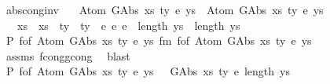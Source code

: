 \begin{isabellebody}
\isamarkupfalse%
%
\endisatagproof
{\isafoldproof}%
%
\isadelimproof
\isanewline
%
\endisadelimproof
\isanewline
\isanewline
{}\isamarkupfalse%
\ abs{\isacharunderscore}{\kern0pt}cong{\isacharunderscore}{\kern0pt}inv{\isacharcolon}{\kern0pt}\isanewline
\ \ \ {\isachardoublequoteopen}Atom\ {\isacharparenleft}{\kern0pt}GAbs\ xs{}\ ty{}\ e{}{\isacharparenright}{\kern0pt}\ ys{}\ {\isasymsimeq}\ Atom\ {\isacharparenleft}{\kern0pt}GAbs\ xs{}\ ty{}\ e{}{\isacharparenright}{\kern0pt}\ ys{}{\isachardoublequoteclose}\isanewline
\ \ \ {\isachardoublequoteopen}xs{}\ {\isacharequal}{\kern0pt}\ xs{}\ {\isasymand}\ ty{}\ {\isacharequal}{\kern0pt}\ ty{}\ {\isasymand}\ e{}\ {\isasymsimeq}e\ e{}\ {\isasymand}\ length\ ys{}\ {\isacharequal}{\kern0pt}\ length\ ys{}{\isachardoublequoteclose}\isanewline
%
\isadelimproof
%
\endisadelimproof
%
\isatagproof
{}\isamarkupfalse%
\ {\isacharminus}{\kern0pt}\isanewline
\ \ \isamarkupfalse%
\ P{}{\isacharcolon}{\kern0pt}\ {\isachardoublequoteopen}f{\isacharunderscore}{\kern0pt}of\ {\isacharparenleft}{\kern0pt}Atom\ {\isacharparenleft}{\kern0pt}GAbs\ xs{}\ ty{}\ e{}{\isacharparenright}{\kern0pt}\ ys{}{\isacharparenright}{\kern0pt}\ {\isasymsimeq}fm\ f{\isacharunderscore}{\kern0pt}of\ {\isacharparenleft}{\kern0pt}Atom\ {\isacharparenleft}{\kern0pt}GAbs\ xs{}\ ty{}\ e{}{\isacharparenright}{\kern0pt}\ ys{}{\isacharparenright}{\kern0pt}{\isachardoublequoteclose}\isanewline
\ \ \ \ \ \isamarkupfalse%
\ assms\ f{\isacharunderscore}{\kern0pt}cong{\isacharunderscore}{\kern0pt}gcong\ \isamarkupfalse%
\ blast\isanewline
\ \ \isamarkupfalse%
\ P{}{\isacharcolon}{\kern0pt}\ {\isachardoublequoteopen}f{\isacharunderscore}{\kern0pt}of\ {\isacharparenleft}{\kern0pt}Atom\ {\isacharparenleft}{\kern0pt}GAbs\ xs{}\ ty{}\ e{}{\isacharparenright}{\kern0pt}\ ys{}{\isacharparenright}{\kern0pt}\ {\isacharequal}{\kern0pt}\ {\isacharbraceleft}{\kern0pt}{\isacharhash}{\kern0pt}\ {\isacharparenleft}{\kern0pt}GAbs\ xs{}\ ty{}\ e{}{\isacharcomma}{\kern0pt}\ length\ ys{}{\isacharparenright}{\kern0pt}\ {\isacharhash}{\kern0pt}{\isacharbraceright}{\kern0pt}{\isachardoublequoteclose}\isanewline

\end{isabellebody}
